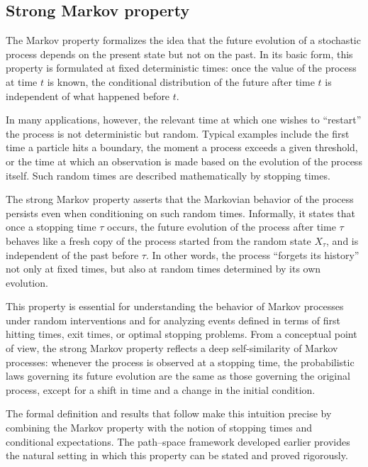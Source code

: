 \subsection{Strong Markov property}

The Markov property formalizes the idea that the future evolution of a stochastic process
depends on the present state but not on the past. In its basic form, this property is
formulated at fixed deterministic times: once the value of the process at time $t$ is
known, the conditional distribution of the future after time $t$ is independent of what
happened before $t$.

In many applications, however, the relevant time at which one wishes to ``restart'' the
process is not deterministic but random. Typical examples include the first time a
particle hits a boundary, the moment a process exceeds a given threshold, or the time at
which an observation is made based on the evolution of the process itself. Such random
times are described mathematically by stopping times.

The strong Markov property asserts that the Markovian behavior of the process persists
even when conditioning on such random times. Informally, it states that once a stopping
time $\tau$ occurs, the future evolution of the process after time $\tau$ behaves like a
fresh copy of the process started from the random state $X_\tau$, and is independent of
the past before $\tau$. In other words, the process ``forgets its history'' not only at
fixed times, but also at random times determined by its own evolution.

This property is essential for understanding the behavior of Markov processes under
random interventions and for analyzing events defined in terms of first hitting times,
exit times, or optimal stopping problems. From a conceptual point of view, the strong
Markov property reflects a deep self-similarity of Markov processes: whenever the process
is observed at a stopping time, the probabilistic laws governing its future evolution are
the same as those governing the original process, except for a shift in time and a change
in the initial condition.

The formal definition and results that follow make this intuition precise by combining
the Markov property with the notion of stopping times and conditional expectations. The
path--space framework developed earlier provides the natural setting in which this
property can be stated and proved rigorously.

